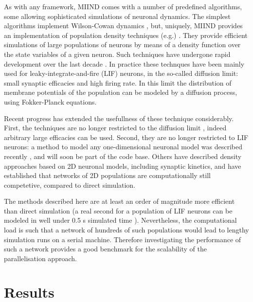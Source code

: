 \documentclass[12pt]{article}
\begin{document}
As with any framework, MIIND comes with a number of predefined algorithms, some allowing sophisticated simulations of neuronal 
dynamics. The simplest algorithms implement Wilson-Cowan dynamics \citep{wilson1972}, but, uniquely, 
MIIND provides an implementation of population density techniques (e.g.) \citep{stein1965,knight1972,knight1996}. They provide efficient simulations 
of large populations of neurons by means of a density function over the state variables of a given neuron. Such techniques have undergone rapid 
development over the last decade \citep{omurtag2000}. In practice these technques have been mainly used for leaky-integrate-and-fire (LIF) neurons,
in the so-called diffusion limit: small synaptic efficacies and high firing rate. In  this limit the distribution of membrane potentials of the
population can be modeled by a diffusion process, using Fokker-Planck equations. 

Recent progress has extended the usefullness of these technique considerably.  First, the techniques are no longer restricted to the diffusion limit 
\citep{omurtag2000,dekamps2003,dekamps2006}, indeed arbitrary large efficacies can be used.  Second, they are no longer restricted to LIF neurons: 
a method to model any one-dimensional neuronal model was described recently \citep{dekamps2013}, and will soon be part of the code base.
Others have described density approaches based on 2D neuronal models, including synaptic kinetics, and have established that networks
of 2D populations are computationally still competetive, compared to direct simulation.
  
The methods described here are at least an order of magnitude more efficient than direct simulation (a real second for a population of LIF neurons
can be modeled in well under 0.5 s simulated time \citep{dekamps2006}). Nevertheless, the computational load is such that a network of hundreds of such 
populations would lead to lengthy simulation runs on a serial machine. Therefore investigating the performance of such a network provides a good
benchmark for the scalability of the parallelisation approach.



\section{Results}
\end{document}
